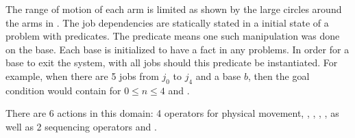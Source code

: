 The range of motion of each arm is limited
as shown by the large circles around the arms in .
The job dependencies are statically stated in a initial state of a problem with
 predicates.
The predicate 
means one such manipulation was done on the base.
Each base is initialized to have a fact 
in any problems.
In order for a base to exit the system, with all jobs should this predicate be instantiated.
For example, when there are 5 jobs from $j_0$ to $j_4$ and a base $b$, then the goal condition
would contain  for $0\leq n \leq 4$ and
 .

There are 6 actions in this domain: 4 operators for physical movement,
, , , , 
as well as 2 sequencing operators  and .


